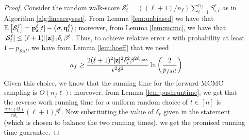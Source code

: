 \begin{proof}
Consider the random walk-score $\mathcal{S}_{t}^{\ell} = ((\ell+1)/n_f)\sum_{i=1}^{n_f}S_{i,t}^{\ell}$ as in Algorithm \ref{alg:linearsysest}. 
From Lemma \ref{lem:unbiased} we have that ${\mathbb{E}}\left[\mathcal{S}_{t}^{\ell}\right] = {\mathbf{p}}_\mathbf{z}^{\ell}[t] - \left< \sigma, \mathbf{q}^{\ell}_t \right>$; moreover, from Lemma \ref{lem:mcmc}, we have that $|\mathcal{S}_{t}^{\ell}|\leq (\ell+1)||\mathbf{z}||_1\delta_r\beta^{\ell}$.
Thus, to achieve relative error $\epsilon$ with probability at least $1-p_{fail}$, we have from Lemma \ref{lem:hoeff} that we need
\begin{align*}
n_f\geq \frac{2 (\ell+1)^2|\mathbf{z}|_1^2 \delta_r^2 \beta^{2\ell_{\max}}}{\epsilon^2\delta^2}\ln \left(\frac{2}{p_{fail}}\right)
\end{align*}
Given this choice, we know that the running time for the forward MCMC sampling is $O(n_f\ell)$; moreover, from Lemma \ref{lem:pushruntime}, we get that the reverse work running time for a uniform random choice of $t\in[n]$ is $\frac{nnz(Q)}{n\delta_r}(\ell+1)\beta^{\ell}$. 
Now substituting the value of $\delta_r$ given in the statement (which is chosen to balance the two running times), we get the promised running time guarantee.
\end{proof}
%
%
